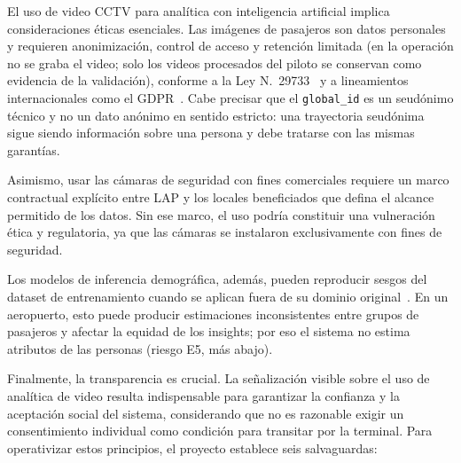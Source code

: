 \documentclass[12pt,a4paper]{article}
\begin{document}
El uso de video CCTV para analítica con inteligencia artificial implica
consideraciones éticas esenciales. Las imágenes de pasajeros son datos
personales y requieren anonimización, control de acceso y retención
limitada (en la operación no se graba el video; solo los videos procesados del piloto se conservan como evidencia de la validación), conforme a la Ley N.\textdegree~29733~\cite{ley29733} y a lineamientos
internacionales como el GDPR~\cite{gdpr}. Cabe precisar que el \texttt{global\_id} es
un seudónimo técnico y no un dato anónimo en sentido estricto: una
trayectoria seudónima sigue siendo información sobre una persona y debe
tratarse con las mismas garantías.

Asimismo, usar las cámaras de seguridad con fines comerciales requiere un
marco contractual explícito entre LAP y los locales beneficiados que
defina el alcance permitido de los datos. Sin ese marco, el uso podría
constituir una vulneración ética y regulatoria, ya que las cámaras se
instalaron exclusivamente con fines de seguridad.

Los modelos de inferencia demográfica, además, pueden reproducir sesgos del dataset de entrenamiento cuando se aplican fuera de su dominio original~\cite{jin2024}. En un aeropuerto, esto puede producir estimaciones inconsistentes entre grupos de pasajeros y afectar la equidad de los insights; por eso el sistema no estima atributos de las personas (riesgo E5, más abajo).

Finalmente, la transparencia es crucial. La señalización visible sobre el
uso de analítica de video resulta indispensable para garantizar la
confianza y la aceptación social del sistema, considerando que no es
razonable exigir un consentimiento individual como condición para
transitar por la terminal. Para operativizar estos principios, el
proyecto establece seis salvaguardas:
\end{document}
